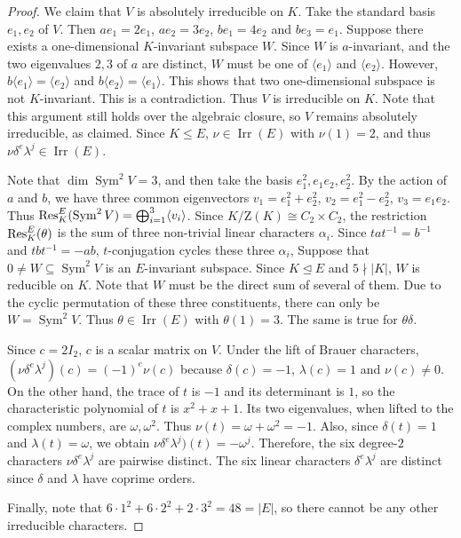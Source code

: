 \documentclass[11pt,a4paper]{article}
\numberwithin{equation}{section}
\theoremstyle{definition}
\theoremstyle{remark}
\newcommand{\Irr}{\operatorname{Irr}}
\newcommand{\Sym}{\operatorname{Sym}}
\newcommand{\ZZ}{\mathrm{Z}}
\begin{document}
\begin{proof}
We claim that \(V\) is absolutely  irreducible on \(K\). Take the standard basis 
$e_1,e_2$ of $V$. Then $ae_1=2e_1$, $ae_2=3e_2$, $be_1=4e_2$ and  $be_3=e_1$.
Suppose there exists a one-dimensional \(K\)-invariant subspace \(W\). Since \(W\) is \(a\)-invariant, and the two eigenvalues \(2,3\) of \(a\) are distinct, \(W\) must be one of  $\langle e_1\rangle$ and $\langle e_2\rangle$. However,
$b\langle e_1\rangle=\langle e_2\rangle$ and 
$b\langle e_2\rangle=\langle e_1\rangle$. This shows that two one-dimensional subspace is not \(K\)-invariant. This is a contradiction. Thus 
$V$ is  irreducible on \(K\). Note that this argument still holds over the algebraic closure, so $V$ remains absolutely irreducible, as claimed.
Since \(K\leq E\), $\nu\in \Irr(E)$ with $\nu(1)=2$,
and thus $\nu\delta^e\lambda^j\in\Irr(E)$.

Note that $\dim \Sym^2V=3$, and then take the basis $e_1^2, e_1e_2, e_2^2$. By the action of $a$ and $b$, we have three common eigenvectors
$v_1=e_1^2+e_2^2$, $v_2=e_1^2-e_2^2$, $v_3=e_1e_2$.
Thus ${\rm Res}_K^E(\Sym^2V)=\bigoplus_{i=1}^3 \langle v_i \rangle$. Since $K/\ZZ(K)\cong C_2\times C_2$, the restriction ${\rm Res}_K^E(\theta)$ is the sum of three non-trivial linear characters $\alpha_i$.  Since $tat^{-1}=b^{-1}$ and $tbt^{-1}=-ab$, \(t\)-conjugation cycles these three $\alpha_i$,
Suppose that  $0\neq W\subseteq \Sym^2V$ is an 
$E$-invariant subspace. Since $K\unlhd E$ and $5\nmid|K|$, $W$ is reducible on $K$.
Note that $W$ must be the direct sum of several of them. Due to the cyclic permutation of these three constituents, there can only be $W=\Sym^2V$.
Thus $\theta\in \Irr(E)$ with $\theta(1)=3$.
The same is true for $\theta\delta$.

Since $c=2I_2$, \(c\) is a scalar matrix on \(V \).
Under the lift of Brauer characters,  
$(\nu\delta^e\lambda^j)(c)=(-1)^e\nu(c)$ because $\delta(c)=-1$, $\lambda(c)=1$ and $\nu(c)\neq0$. On the other hand, the trace of $t$ is $-1$
and  its determinant is $1$, so the characteristic polynomial of $t$ is $x^2+x+1$. Its two eigenvalues, when lifted to the complex numbers, are $\omega,\omega^2$. Thus $\nu(t)=\omega+\omega^2=-1$.
Also, since $\delta(t)=1$ and $\lambda(t)=\omega$,
we obtain $\nu\delta^e\lambda^j)(t) =-\omega^j$.
Therefore, the six degree-$2$ characters $\nu\delta^e\lambda^j$ are pairwise distinct.
The six linear characters $\delta^e\lambda^j$ are distinct since \(\delta\) and \(\lambda\) have coprime orders. 

Finally, 
note that $6\cdot1^2+6\cdot2^2+2\cdot3^2=48=|E|$, so there cannot be any other irreducible characters.
\end{proof}
\end{document}
